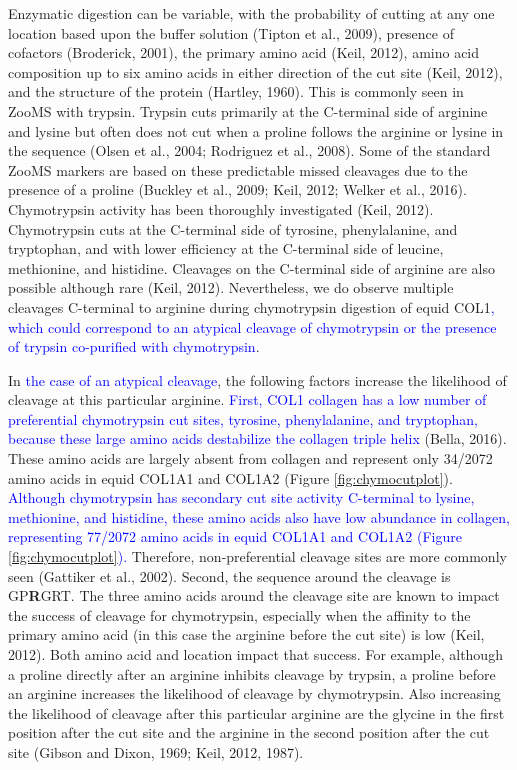 \documentclass[preprint, 3p, authoryear]{elsarticle} %
\begin{document}
Enzymatic digestion can be variable, with the probability of cutting at any one location based upon the buffer solution (Tipton et al., 2009), presence of cofactors (Broderick, 2001), the primary amino acid (Keil, 2012), amino acid composition up to six amino acids in either direction of the cut site (Keil, 2012), and the structure of the protein (Hartley, 1960). This is commonly seen in ZooMS with trypsin. Trypsin cuts primarily at the C-terminal side of arginine and lysine but often does not cut when a proline follows the arginine or lysine in the sequence (Olsen et al., 2004; Rodriguez et al., 2008). Some of the standard ZooMS markers are based on these predictable missed cleavages due to the presence of a proline (Buckley et al., 2009; Keil, 2012; Welker et al., 2016). Chymotrypsin activity has been thoroughly investigated (Keil, 2012). Chymotrypsin cuts at the C-terminal side of tyrosine, phenylalanine, and tryptophan, and with lower efficiency at the C-terminal side of leucine, methionine, and histidine. Cleavages on the C-terminal side of arginine are also possible although rare (Keil, 2012). Nevertheless, we do observe multiple cleavages C-terminal to arginine during chymotrypsin digestion of equid COL1\textcolor{blue}{, which could correspond to an atypical cleavage of chymotrypsin or the presence of trypsin co-purified with chymotrypsin}.

In \textcolor{blue}{the case of an atypical cleavage}, the following factors increase the likelihood of cleavage at this particular arginine. \textcolor{blue}{First, COL1 collagen has a low number of preferential chymotrypsin cut sites, tyrosine, phenylalanine, and tryptophan, because these large amino acids destabilize the collagen triple helix} (Bella, 2016). These amino acids are largely absent from collagen and represent only 34/2072 amino acids in equid COL1A1 and COL1A2 (Figure \ref{fig:chymocutplot}). \textcolor{blue}{Although chymotrypsin has secondary cut site activity C-terminal to lysine, methionine, and histidine, these amino acids also have low abundance in collagen, representing 77/2072 amino acids in equid COL1A1 and COL1A2 (Figure \ref{fig:chymocutplot}).} Therefore, non-preferential cleavage sites are more commonly seen (Gattiker et al., 2002). Second, the sequence around the cleavage is GP\textbf{R}GRT. The three amino acids around the cleavage site are known to impact the success of cleavage for chymotrypsin, especially when the affinity to the primary amino acid (in this case the arginine before the cut site) is low (Keil, 2012). Both amino acid and location impact that success. For example, although a proline directly after an arginine inhibits cleavage by trypsin, a proline before an arginine increases the likelihood of cleavage by chymotrypsin. Also increasing the likelihood of cleavage after this particular arginine are the glycine in the first position after the cut site and the arginine in the second position after the cut site (Gibson and Dixon, 1969; Keil, 2012, 1987).
\end{document}
